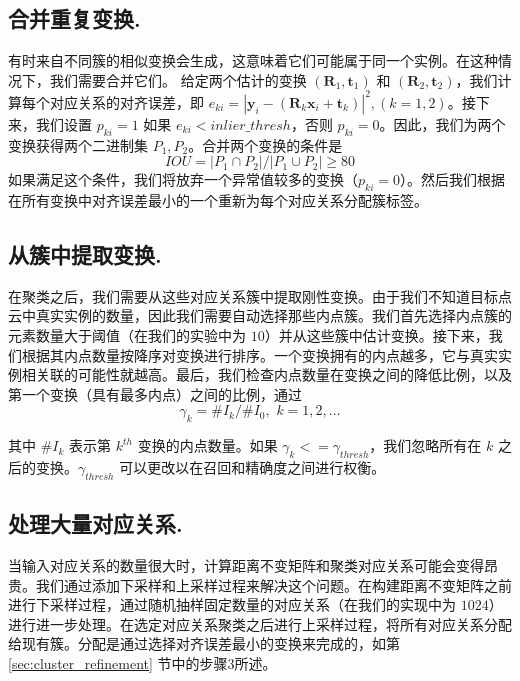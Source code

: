\subsection{合并重复变换.}
有时来自不同簇的相似变换会生成，这意味着它们可能属于同一个实例。在这种情况下，我们需要合并它们。
给定两个估计的变换 $(\mathbf{R}_1, \mathbf{t}_1)$ 和 $(\mathbf{R}_2, \mathbf{t}_2)$，我们计算每个对应关系的对齐误差，即 $e_{ki} = |\mathbf{y}_{i}-(\mathbf{R}_k \mathbf{x}_{i} + \mathbf{t}_k)|^2, (k = 1,2)$。接下来，我们设置 $p_{ki} = 1$ 如果 $e_{ki} < inlier\_thresh$，否则 $p_{ki}=0$。因此，我们为两个变换获得两个二进制集 $P_1, P_2$。合并两个变换的条件是
\begin{equation}
IOU = |P_1 \cap P_2|/|P_1 \cup P_2| \geq 80%
\label{eq:iou}
\end{equation}
如果满足这个条件，我们将放弃一个异常值较多的变换（$p_{ki} = 0$）。然后我们根据在所有变换中对齐误差最小的一个重新为每个对应关系分配簇标签。

\subsection{从簇中提取变换.}
在聚类之后，我们需要从这些对应关系簇中提取刚性变换。由于我们不知道目标点云中真实实例的数量，因此我们需要自动选择那些内点簇。我们首先选择内点簇的元素数量大于阈值（在我们的实验中为 $10$）并从这些簇中估计变换。接下来，我们根据其内点数量按降序对变换进行排序。一个变换拥有的内点越多，它与真实实例相关联的可能性就越高。最后，我们检查内点数量在变换之间的降低比例，以及第一个变换（具有最多内点）之间的比例，通过
\begin{equation}
    \gamma_k = \#I_{k}/\#I_{0},\,\, k = 1,2,\ldots
\end{equation}

其中 $\#I_k$ 表示第 $k^{th}$ 变换的内点数量。如果 $\gamma_k <= \gamma_{thresh}$，我们忽略所有在 $k$ 之后的变换。$\gamma_{thresh}$ 可以更改以在召回和精确度之间进行权衡。

\subsection{处理大量对应关系.}
当输入对应关系的数量很大时，计算距离不变矩阵和聚类对应关系可能会变得昂贵。我们通过添加下采样和上采样过程来解决这个问题。在构建距离不变矩阵之前进行下采样过程，通过随机抽样固定数量的对应关系（在我们的实现中为 $1024$）进行进一步处理。在选定对应关系聚类之后进行上采样过程，将所有对应关系分配给现有簇。分配是通过选择对齐误差最小的变换来完成的，如第 \ref{sec:cluster_refinement} 节中的步骤3所述。


